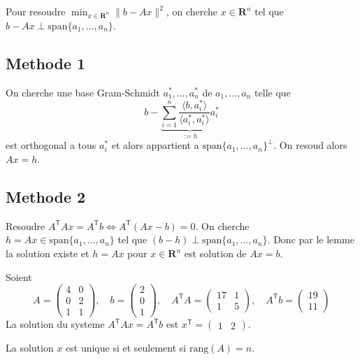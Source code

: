 Pour resoudre $\min_{x \in \mathbf{R}^{n}}\lVert b - Ax \rVert^{2}$, on cherche $x \in \mathbf{R}^{n}$ tel que $b-Ax\perp \mathrm{span}\{ a_{1},\dots,a_{n} \}$.

\subsection*{Methode 1}

On cherche une base Gram-Schmidt $a_{1}^{*},\dots,a_{n}^{*}$ de $a_{1},\dots,a_{n}$ telle que 
$$
b-\underbrace{ \sum_{i=1}^{n} \frac{\langle b,a_{i}^{*} \rangle }{\langle a_{i}^{*},a_{i}^{*} \rangle }a_{i}^{*} }_{ := h }
$$
est orthogonal a tous $a_{i}^{*}$ et alors appartient a $\mathrm{span}\{ a_{1},\dots,a_{n} \}^{\perp}$. On resoud alors $Ax=h$.

\subsection*{Methode 2}

Resoudre $A^{\mathsf{T}}Ax=A^{\mathsf{T}}b\Leftrightarrow A^{\mathsf{T}}(Ax-b)=0$. On cherche $h=Ax \in \mathrm{span}\{ a_{1},\dots,a_{n} \}$ tel que $(b-h)\perp \mathrm{span}\{ a_{1},\dots,a_{n} \}$. Donc par le lemme la solution existe et $h=Ax$ pour $x \in \mathbf{R}^{n}$ est solution de $Ax=b$.

\begin{example}
Soient 
$$
A=\begin{pmatrix}
4 & 0 \\
0 & 2 \\
1 & 1
\end{pmatrix},\quad b=\begin{pmatrix}
2 \\
0 \\
1
\end{pmatrix},\quad A^{\mathsf{T}}A=\begin{pmatrix}
17 & 1  \\
1 & 5
\end{pmatrix},\quad A^{\mathsf{T}}b=\begin{pmatrix}
19 \\
11
\end{pmatrix}
$$
La solution du systeme $A^{\mathsf{T}}Ax=A^{\mathsf{T}}b$ est $x^{\mathsf{T}}=\begin{pmatrix}1 & 2\end{pmatrix}$.
\end{example}
\begin{remark}
La solution $x$ est unique si et seulement si $\mathrm{rang}(A)=n$.
\end{remark}

